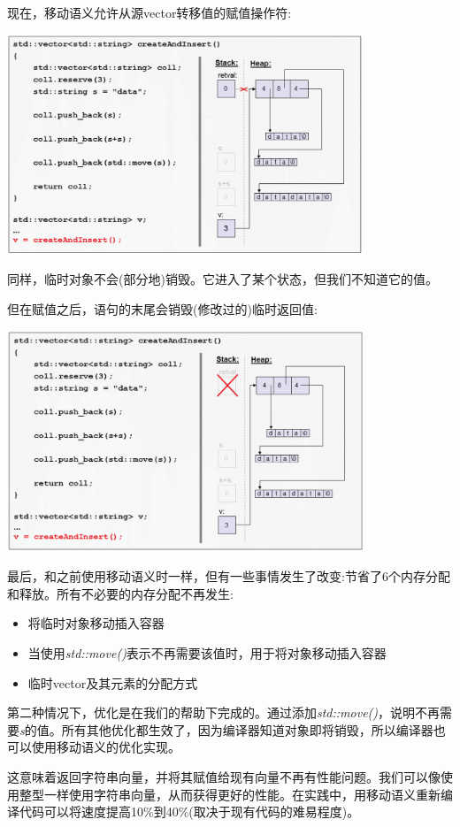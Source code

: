 \begin{itemize}
	现在，移动语义允许从源vector转移值的赋值操作符:
\begin{center}
		\includegraphics[width=0.8\textwidth]{part1/ch1/images/16}
	\end{center}
	同样，临时对象不会(部分地)销毁。它进入了某个状态，但我们不知道它的值。

	但在赋值之后，语句的末尾会销毁(修改过的)临时返回值:
\begin{center}
		\includegraphics[width=0.8\textwidth]{part1/ch1/images/17}
	\end{center}
\end{itemize}

最后，和之前使用移动语义时一样，但有一些事情发生了改变:节省了6个内存分配和释放。所有不必要的内存分配不再发生:

\begin{itemize}
	\item 将临时对象移动插入容器
	\item 当使用\textit{std::move()}表示不再需要该值时，用于将对象移动插入容器
	\item 临时vector及其元素的分配方式
\end{itemize}

第二种情况下，优化是在我们的帮助下完成的。通过添加\textit{std::move()}，说明不再需要\textit{s}的值。所有其他优化都生效了，因为编译器知道对象即将销毁，所以编译器也可以使用移动语义的优化实现。

这意味着返回字符串向量，并将其赋值给现有向量不再有性能问题。我们可以像使用整型一样使用字符串向量，从而获得更好的性能。在实践中，用移动语义重新编译代码可以将速度提高10\%到40\%(取决于现有代码的难易程度)。


























